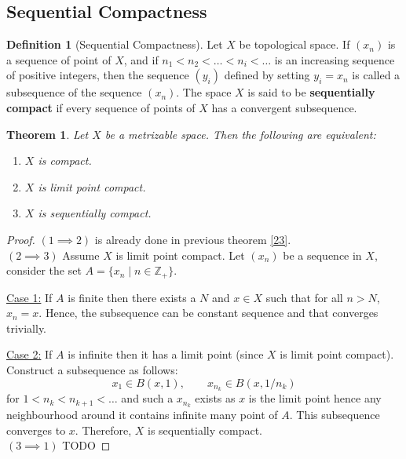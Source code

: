 \documentclass[12pt,reqno]{amsart}
\theoremstyle{plain}
\newtheorem{thm}{Theorem}
\theoremstyle{definition}
\newtheorem{defn}{Definition}
\newcommand{\bb}[1]{\mathbb{#1}}
\begin{document}
\subsection{Sequential Compactness}
\begin{defn}[Sequential Compactness]
    Let $X$ be topological space. If $(x_n)$ is a sequence of point of $X$, and if $n_1 < n_2 < \dots < n_i < \dots $ is an increasing sequence of positive integers, then the sequence $(y_i)$ defined by setting $y_i = x_n$ is called a subsequence of the sequence $(x_n)$. The space $X$ is said to be {\bf sequentially compact} if every sequence of points of $X$ has a convergent subsequence.
\end{defn}
\begin{thm}
    Let $X$ be a metrizable space. Then the following are equivalent:
    \begin{enumerate}
        \item $X$ is compact.
        \item $X$ is limit point compact.
        \item $X$ is sequentially compact.
    \end{enumerate}
\end{thm}
\begin{proof}
    $(1 \implies 2)$ is already done in previous theorem \ref{23}. \\
    $(2 \implies 3)$ Assume $X$ is limit point compact. Let $(x_n)$ be a sequence in $X$, consider the set $A = \{x_n \mid n \in \bb Z_+\}$. 
    
    \noindent \underline{Case 1:} If $A$ is finite then there exists a $N$ and $x \in X$ such that for all $n > N$, $x_n = x$. Hence, the subsequence can be constant sequence and that converges trivially.

    \noindent \underline{Case 2:} If $A$ is infinite then it has a limit point (since $X$ is limit point compact). Construct a subsequence as follows: 
    $$ x_1 \in B(x,1), \qquad x_{n_k} \in B(x,1/n_k)$$
    for $1 < n_k < n_{k+1} < \dots$ and such a $x_{n_k}$ exists as $x$ is the limit point hence any neighbourhood around it contains infinite many point of $A$. This subsequence converges to $x$. Therefore, $X$ is sequentially compact. \\
    $(3 \implies 1)$ TODO
\end{proof}
\end{document}
